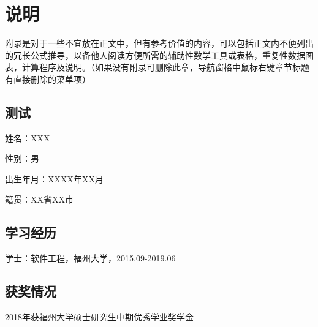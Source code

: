 \documentclass[doctor]{thesis}
\begin{document}
\thesisappendix
\chapter{说明}
附录是对于一些不宜放在正文中，但有参考价值的内容，可以包括正文内不便列出的冗长公式推导，以备他人阅读方便所需的辅助性数学工具或表格，重复性数据图表，计算程序及说明。（如果没有附录可删除此章，导航窗格中鼠标右键章节标题有直接删除的菜单项） 
\section{测试}

\begin{thesisResume}
    \begin{description}[labelsep=0pt, leftmargin=*]
        \item 姓\hspace{24pt}名：XXX
        \item 性\hspace{24pt}别：男
        \item 出生年月：XXXX年XX月
        \item 籍\hspace{24pt}贯：XX省XX市
    \end{description}

    \section*{\heiti\fontsize{14pt}{16.8pt}\selectfont 学习经历}
    \begin{description}[labelsep=0pt, leftmargin=*]
        \item 学士：软件工程，福州大学，2015.09-2019.06
    \end{description}

    \section*{\heiti\fontsize{14pt}{16.8pt}\selectfont 获奖情况}
    \begin{description}[labelsep=0pt, leftmargin=*]
        \item 2018年获福州大学硕士研究生中期优秀学业奖学金
    \end{description}
\end{thesisResume}
\end{document}
